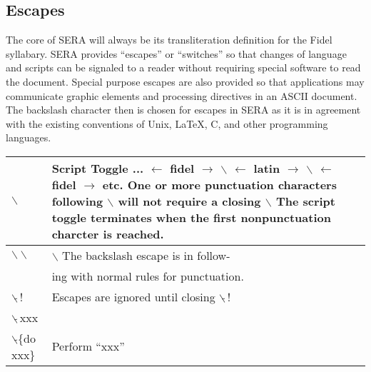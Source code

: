 \subsection{Escapes}

The core of SERA will always be its transliteration definition for the Fidel
syllabary. SERA provides ``escapes'' or ``switches'' so that changes of
language and scripts can be signaled to a reader without requiring special
software to read the document. Special purpose escapes are also provided so
that applications may communicate graphic elements and processing directives in
an ASCII document. \\


The backslash character then is chosen for escapes in SERA as it is in
agreement with the existing conventions of Unix, \LaTeX, C, and other
programming languages. 


\noi
\begin{tabular}{|l|l|} \hline
  $\backslash$   &   \parbox{2.0in}{\scriptsize Script Toggle ... $\leftarrow$ fidel $\rightarrow$ $\backslash$ $\leftarrow$ latin $\rightarrow$ $\backslash$ $\leftarrow$ fidel $\rightarrow$ etc. 
                     One or more punctuation characters following $\backslash$ will not 
                     require a closing $\backslash$  The script toggle terminates when the 
                     first nonpunctuation charcter is reached.}\\ \hline

  $\backslash\backslash$  &  \small{$\backslash$ The backslash escape is in follow-}\\ 
                &    \small{ing with normal rules for punctuation.}\\ \hline

  $\backslash\tilde{}\,$!   &   Escapes are ignored until closing $\backslash\tilde{}\,$!  \\ \hline



  $\backslash\tilde{}\,$xxx &  \\
  $\backslash\tilde{}$\{do xxx\}    &       Perform ``xxx''  \\ \hline
\end{tabular} \\

